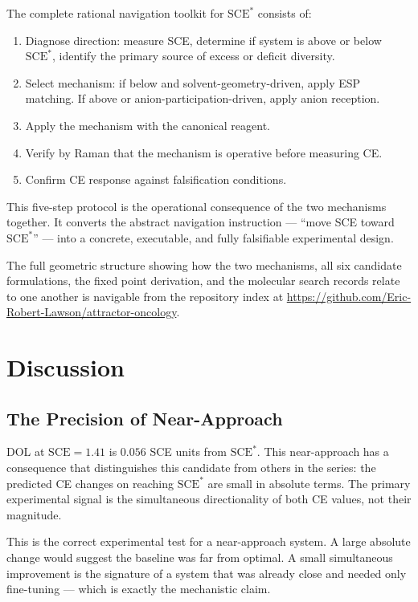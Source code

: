 \documentclass[11pt]{article}
\theoremstyle{plain}
\theoremstyle{definition}
\theoremstyle{remark}
\begin{document}
The complete rational navigation toolkit for $\mathrm{SCE}^{*}$
consists of:
\begin{enumerate}[leftmargin=2em]
  \item Diagnose direction: measure SCE, determine if system is above
        or below $\mathrm{SCE}^{*}$, identify the primary source of
        excess or deficit diversity.
  \item Select mechanism: if below and solvent-geometry-driven, apply
        ESP matching.  If above or anion-participation-driven, apply
        anion reception.
  \item Apply the mechanism with the canonical reagent.
  \item Verify by Raman that the mechanism is operative before
        measuring CE.
  \item Confirm CE response against falsification conditions.
\end{enumerate}

This five-step protocol is the operational consequence of the two
mechanisms together.  It converts the abstract navigation instruction
--- ``move SCE toward $\mathrm{SCE}^{*}$'' --- into a concrete,
executable, and fully falsifiable experimental design.

The full geometric structure showing how the two mechanisms, all six
candidate formulations, the fixed point derivation, and the molecular
search records relate to one another is navigable from the repository
index at \url{https://github.com/Eric-Robert-Lawson/attractor-oncology}.

\section{Discussion}

\subsection{The Precision of Near-Approach}

DOL at $\mathrm{SCE} = 1.41$ is $0.056$ SCE units from $\mathrm{SCE}^{*}$.
This near-approach has a consequence that distinguishes this candidate
from others in the series: the predicted CE changes on reaching
$\mathrm{SCE}^{*}$ are small in absolute terms.  The primary experimental
signal is the simultaneous directionality of both CE values, not their
magnitude.

This is the correct experimental test for a near-approach system.
A large absolute change would suggest the baseline was far from optimal.
A small simultaneous improvement is the signature of a system that was
already close and needed only fine-tuning --- which is exactly the
mechanistic claim.
\end{document}

